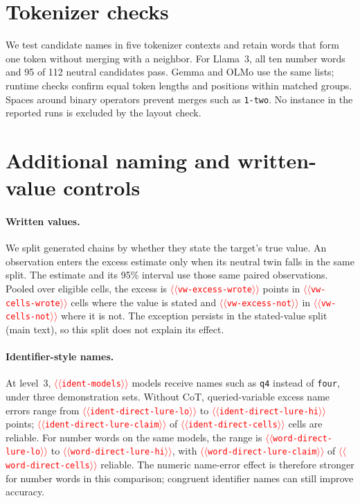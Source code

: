 \documentclass[11pt]{article}
\providecommand{\NUM}[1]{\textcolor{red}{$\langle\langle$\texttt{#1}$\rangle\rangle$}}
\begin{document}
\section{Tokenizer checks}
\label{app:tok}
We test candidate names in five tokenizer contexts and retain words that form one token
without merging with a neighbor. For Llama~3, all ten number words and 95 of 112 neutral
candidates pass. Gemma and OLMo use the same lists; runtime checks confirm equal token lengths
and positions within matched groups. Spaces around binary operators prevent merges such as
\texttt{1-two}. No instance in the reported runs is excluded by the layout check.

\section{Additional naming and written-value controls}
\label{app:controls}

\paragraph{Written values.} We split generated chains by whether they state the target's true
value. An observation enters the excess estimate only when its neutral twin falls in the same
split. The estimate and its 95\% interval use those same paired observations. Pooled over
eligible cells, the excess is \NUM{vw-excess-wrote} points in \NUM{vw-cells-wrote} cells where
the value is stated and \NUM{vw-excess-not} in \NUM{vw-cells-not} where it is not. The exception
persists in the stated-value split (main text), so this split does not explain its effect.

\paragraph{Identifier-style names.} At level~3, \NUM{ident-models} models receive names such as
\texttt{q4} instead of \texttt{four}, under three demonstration sets. Without CoT, queried-variable
excess name errors range from \NUM{ident-direct-lure-lo} to \NUM{ident-direct-lure-hi} points;
\NUM{ident-direct-lure-claim} of \NUM{ident-direct-cells} cells are reliable. For number words
on the same models, the range is \NUM{word-direct-lure-lo} to \NUM{word-direct-lure-hi}, with
\NUM{word-direct-lure-claim} of \NUM{word-direct-cells} reliable. The numeric name-error effect is
therefore stronger for number words in this comparison; congruent identifier names can still
improve accuracy.
\end{document}
